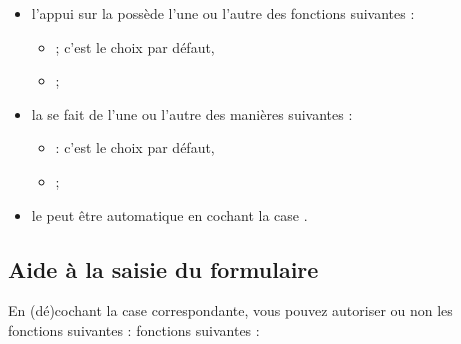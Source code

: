 \begin{itemize}
	\item l'appui sur la  possède l'une ou l'autre des fonctions suivantes  :
		\begin{itemize}
			\item {} ; c'est le choix par défaut,
			\item {} ;
		\end{itemize}
		
	\item la  se fait de l'une ou l'autre des manières suivantes :
		
		\begin{itemize}
			\item {} : c'est le choix par défaut,
			\item {} ;
		\end{itemize}
	\item le  peut être automatique en cochant la case .
\end{itemize}


\subsection{Aide à la saisie du formulaire\label{setup-form-input}}

En (dé)cochant la case correspondante, vous pouvez autoriser ou non les \ifIllustration fonctions suivantes :
\else fonctions suivantes :
\fi

